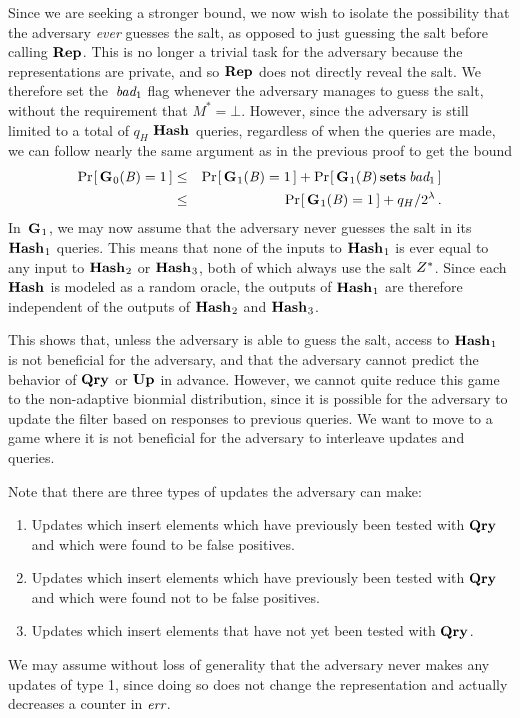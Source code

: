 Since we are seeking a stronger bound, we now wish to isolate the possibility that the adversary \emph{ever} guesses the salt, as opposed to just guessing the salt before calling $\textup{\textbf{Rep}}\hspace{0.5pt}$. This is no longer a trivial task for the adversary because the representations are private, and so $\textup{\textbf{Rep}}\hspace{0.5pt}$ does not directly reveal the salt. We therefore set the~$\textit{bad}_1$ flag whenever the adversary manages to guess the salt, without the requirement that $M^* = \bot$. However, since the adversary is still limited to a total of $q_H$ $\textup{\textbf{Hash}}\hspace{0.5pt}$ queries, regardless of when the queries are made, we can follow nearly the same argument as in the previous proof to get the bound
%
\begin{eqnarray}
  \Pr\hspace{-1pt}\left[\,\textup{\textbf{G}}\hspace{0.5pt}_0(\mathit{B})=1\,\right] &\leq&
    \Pr\hspace{-1pt}\left[\,\textup{\textbf{G}}\hspace{0.5pt}_1(\mathit{B})=1\,\right] + \Pr\hspace{-1pt}\left[\,\textup{\textbf{G}}\hspace{0.5pt}_1(\mathit{B}) \,\textup{\textbf{sets}}\hspace{0.5pt}\, \textit{bad}_1\,\right]\\
  &\leq&
    \Pr\hspace{-1pt}\left[\,\textup{\textbf{G}}\hspace{0.5pt}_1(\mathit{B})=1\,\right] + q_H/2^\lambda \,.
\end{eqnarray}
%
In~$\textup{\textbf{G}}\hspace{0.5pt}_1$, we may now assume that the adversary never guesses the salt in its $\textup{\textbf{Hash}}\hspace{0.5pt}_1$ queries. This means that none of the inputs to $\textup{\textbf{Hash}}\hspace{0.5pt}_1$ is ever equal to any input to $\textup{\textbf{Hash}}\hspace{0.5pt}_2$ or $\textup{\textbf{Hash}}\hspace{0.5pt}_3$, both of which always use the salt $Z^*$. Since each $\textup{\textbf{Hash}}\hspace{0.5pt}$ is modeled as a random oracle, the outputs of $\textup{\textbf{Hash}}\hspace{0.5pt}_1$ are therefore independent of the outputs of $\textup{\textbf{Hash}}\hspace{0.5pt}_2$ and $\textup{\textbf{Hash}}\hspace{0.5pt}_3$.

This shows that, unless the adversary is able to guess the salt, access to $\textup{\textbf{Hash}}\hspace{0.5pt}_1$ is not beneficial for the adversary, and that the adversary cannot predict the behavior of $\textup{\textbf{Qry}}\hspace{0.5pt}$ or $\textup{\textbf{Up}}\hspace{0.5pt}$ in advance. However, we cannot quite reduce this game to the non-adaptive bionmial distribution, since it is possible for the adversary to update the filter based on responses to previous queries. We want to move to a game where it is not beneficial for the adversary to interleave updates and queries.

Note that there are three types of updates the adversary can make:
\begin{enumerate}
  \item Updates which insert elements which have previously been tested with $\textup{\textbf{Qry}}\hspace{0.5pt}$ and which were found to be false positives.
  \item Updates which insert elements which have previously been tested with $\textup{\textbf{Qry}}\hspace{0.5pt}$ and which were found not to be false positives.
  \item Updates which insert elements that have not yet been tested with $\textup{\textbf{Qry}}\hspace{0.5pt}$.
\end{enumerate}
We may assume without loss of generality that the adversary never makes any updates of type 1, since doing so does not change the representation and actually decreases a counter in $\textit{err}$.

